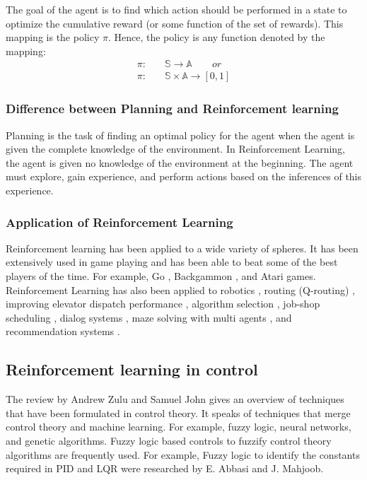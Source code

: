 \documentclass[hidelinks,BTech]{iitmdiss}
\begin{document}
The goal of the agent is to find which action should be performed in a state to optimize the cumulative reward (or some function of the set of rewards). This mapping is the policy $\pi$. Hence, the policy is any function denoted by the mapping:
\begin{equation} \begin{split}
  \pi :& \quad \mathbb{S} \rightarrow \mathbb{A} \qquad or \\
  \pi :& \quad \mathbb{S} \times \mathbb{A} \rightarrow [0,1]
\end{split} \end{equation}

\subsubsection{Difference between Planning and Reinforcement learning}

Planning is the task of finding an optimal policy for the agent when the agent is given the complete knowledge of the environment. In Reinforcement Learning, the agent is given no knowledge of the environment at the beginning. The agent must explore, gain experience, and perform actions based on the inferences of this experience.

\subsubsection{Application of Reinforcement Learning}
Reinforcement learning has been applied to a wide variety of spheres. It has been extensively used in game playing and has been able to beat some of the best players of the time. For example, Go \cite{RLInGo}, Backgammon \cite{RLInBackgammon}, and Atari games. Reinforcement Learning has also been applied to robotics \cite{HelicopterPegasus}, routing (Q-routing) \cite{RLInQRouting},
improving elevator dispatch performance \cite{RLInElevators}, algorithm
selection \cite{RLInAlgoSelection}, job-shop scheduling \cite{RLInJobShopScheduling}, dialog systems \cite{RLInDialogSystems}, maze solving with multi agents \cite{PredatorPrey}, and recommendation systems \cite{RLInRecommenders}.

\subsection{Reinforcement learning in control}

The review \cite{ControlForQuads} by Andrew Zulu and Samuel John gives an overview of techniques that have been formulated in control theory. It speaks of techniques that merge control theory and machine learning. For example, fuzzy logic, neural networks, and genetic algorithms. Fuzzy logic based controls to fuzzify control theory algorithms are frequently used. For example, Fuzzy logic to identify the constants required in PID and LQR were researched by E. Abbasi and J. Mahjoob.
\end{document}
